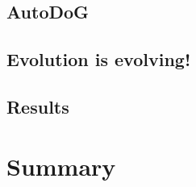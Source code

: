 \documentclass{beamer}
\begin{document}

\subsection{AutoDoG}


\subsection{Evolution is evolving!}
\subsection{Results}

\section[Summary]{Summary}
\end{document}
